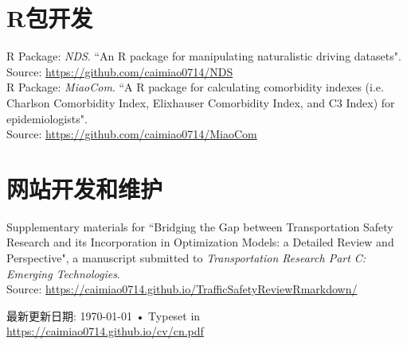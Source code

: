 \documentclass[11pt, a4paper]{article}
\newcommand{\years}[1]{\marginnote{\scriptsize #1}}
\begin{document}
\section*{R包开发}
\years{2019}R Package: \emph{NDS}. ``An R package for manipulating naturalistic driving datasets".\\ Source: \href{https://github.com/caimiao0714/NDS}{https://github.com/caimiao0714/NDS}\\[6pt]
\years{2017}R Package: \emph{MiaoCom}. ``A R package for calculating comorbidity indexes (i.e. Charlson Comorbidity Index, Elixhauser Comorbidity Index, and C3 Index) for epidemiologists".\\ Source: \href{https://github.com/caimiao0714/MiaoCom}{https://github.com/caimiao0714/MiaoCom}

\section*{网站开发和维护}
\years{2019}Supplementary materials for ``Bridging the Gap between Transportation Safety Research and its Incorporation in Optimization Models: a Detailed Review and Perspective", a manuscript submitted to \emph{Transportation Research Part C: Emerging Technologies}.\\ Source: \href{https://caimiao0714.github.io/TrafficSafetyReviewRmarkdown/}{https://caimiao0714.github.io/TrafficSafetyReviewRmarkdown/}


\vfill{}

\begin{center}
{\scriptsize  最新更新日期: \today\- •\- 
Typeset in \href{https://caimiao0714.github.io/cv/cn.pdf}{
\XeTeX }\\
\href{https://caimiao0714.github.io/cv/cn.pdf}{https://caimiao0714.github.io/cv/cn.pdf}}
\end{center}
\end{document}
